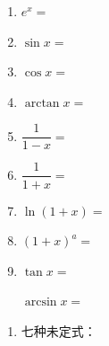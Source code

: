 \documentclass[a4paper,12pt]{article}
\begin{document}
    \vspace{1em}
    \begin{enumerate}[itemsep=1.6em]
        \item $e^x =$
        \item $\sin x =$
        \item $\cos x =$
        \item $\arctan x =$
        \item $\dfrac{1}{1-x} =$
        \item $\dfrac{1}{1+x} =$
        \item $\ln(1+x) =$
        \item $(1+x)^a =$
        \item
        \begin{minipage}[t]{0.48\textwidth}
            $\tan x =$
        \end{minipage}
        \hfill
        \begin{minipage}[t]{0.48\textwidth}
            $\arcsin x =$
        \end{minipage}
    \end{enumerate}

    \newpage

    \begin{enumerate}[itemsep=1.6em]
        \item 七种未定式：
    \end{enumerate}

    \vspace{2em}
\end{document}
